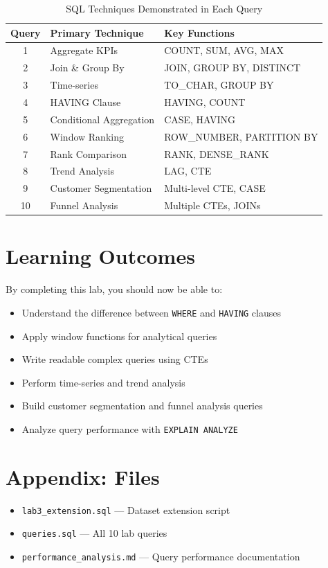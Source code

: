 \documentclass[11pt,a4paper]{article}
\begin{document}
\begin{table}[h]
\centering
\caption{SQL Techniques Demonstrated in Each Query}
\label{tab:summary}
\begin{tabular}{@{}cll@{}}
\toprule
\textbf{Query} & \textbf{Primary Technique} & \textbf{Key Functions} \\ \midrule
1 & Aggregate KPIs & COUNT, SUM, AVG, MAX \\
2 & Join \& Group By & JOIN, GROUP BY, DISTINCT \\
3 & Time-series & TO\_CHAR, GROUP BY \\
4 & HAVING Clause & HAVING, COUNT \\
5 & Conditional Aggregation & CASE, HAVING \\
6 & Window Ranking & ROW\_NUMBER, PARTITION BY \\
7 & Rank Comparison & RANK, DENSE\_RANK \\
8 & Trend Analysis & LAG, CTE \\
9 & Customer Segmentation & Multi-level CTE, CASE \\
10 & Funnel Analysis & Multiple CTEs, JOINs \\ \bottomrule
\end{tabular}
\end{table}

\section{Learning Outcomes}

By completing this lab, you should now be able to:
\begin{itemize}[noitemsep]
    \item Understand the difference between \texttt{WHERE} and \texttt{HAVING} clauses
    \item Apply window functions for analytical queries
    \item Write readable complex queries using CTEs
    \item Perform time-series and trend analysis
    \item Build customer segmentation and funnel analysis queries
    \item Analyze query performance with \texttt{EXPLAIN ANALYZE}
\end{itemize}

\section*{Appendix: Files}

\begin{itemize}[noitemsep]
    \item \texttt{lab3\_extension.sql} — Dataset extension script
    \item \texttt{queries.sql} — All 10 lab queries
    \item \texttt{performance\_analysis.md} — Query performance documentation
\end{itemize}
\end{document}

